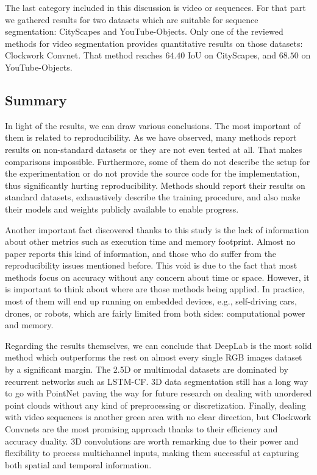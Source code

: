 The last category included in this discussion is video or sequences. For that part we gathered results for two datasets which are suitable for sequence segmentation: CityScapes and YouTube-Objects. Only one of the reviewed methods for video segmentation provides quantitative results on those datasets: Clockwork Convnet. That method reaches $64.40$ \acs{IoU} on CityScapes, and $68.50$ on YouTube-Objects.

\subsection{Summary}

In light of the results, we can draw various conclusions. The most important of them is related to reproducibility. As we have observed, many methods report results on non-standard datasets or they are not even tested at all. That makes comparisons impossible. Furthermore, some of them do not describe the setup for the experimentation or do not provide the source code for the implementation, thus significantly hurting reproducibility. Methods should report their results on standard datasets, exhaustively describe the training procedure, and also make their models and weights publicly available to enable progress.

Another important fact discovered thanks to this study is the lack of information about other metrics such as execution time and memory footprint. Almost no paper reports this kind of information, and those who do suffer from the reproducibility issues mentioned before. This void is due to the fact that most methods focus on accuracy without any concern about time or space. However, it is important to think about where are those methods being applied. In practice, most of them will end up running on embedded devices, e.g., self-driving cars, drones, or robots, which are fairly limited from both sides: computational power and memory.

Regarding the results themselves, we can conclude that DeepLab is the most solid method which outperforms the rest on almost every single \acs{RGB} images dataset by a significant margin. The \acs{2.5D} or multimodal datasets are dominated by recurrent networks such as \acs{LSTM-CF}. \acs{3D} data segmentation still has a long way to go with PointNet paving the way for future research on dealing with unordered point clouds without any kind of preprocessing or discretization. Finally, dealing with video sequences is another green area with no clear direction, but Clockwork Convnets are the most promising approach thanks to their efficiency and accuracy duality. \acs{3D} convolutions are worth remarking due to their power and flexibility to process multichannel inputs, making them successful at capturing both spatial and temporal information.

